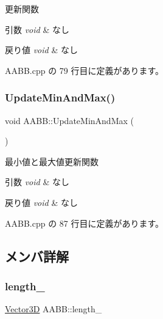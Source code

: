 更新関数 


\begin{DoxyParams}{引数}
{\em void} & なし \\
\hline
\end{DoxyParams}

\begin{DoxyRetVals}{戻り値}
{\em void} & なし \\
\hline
\end{DoxyRetVals}


 A\+A\+B\+B.\+cpp の 79 行目に定義があります。

\mbox{\label{class_a_a_b_b_aad10f509f6726aed8285063a69df9085}} 
\subsubsection{\texorpdfstring{Update\+Min\+And\+Max()}{UpdateMinAndMax()}}
{\footnotesize\ttfamily void A\+A\+B\+B\+::\+Update\+Min\+And\+Max (\begin{DoxyParamCaption}{ }\end{DoxyParamCaption})\hspace{0.3cm}{\ttfamily [private]}}



最小値と最大値更新関数 


\begin{DoxyParams}{引数}
{\em void} & なし \\
\hline
\end{DoxyParams}

\begin{DoxyRetVals}{戻り値}
{\em void} & なし \\
\hline
\end{DoxyRetVals}


 A\+A\+B\+B.\+cpp の 87 行目に定義があります。



\subsection{メンバ詳解}
\mbox{\label{class_a_a_b_b_abade307dbbfa9c74638fde5387d629f8}} 
\subsubsection{\texorpdfstring{length\+\_\+}{length\_}}
{\footnotesize\ttfamily \mbox{\hyperlink{class_vector3_d}{Vector3D}} A\+A\+B\+B\+::length\+\_\+\hspace{0.3cm}{\ttfamily [private]}}



